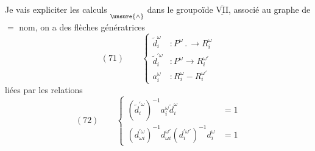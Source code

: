 Je vais expliciter les calculs $\underset{\unsure{\wedge}}{\vphantom{x}}$ dans le groupoïde $\overline{\underline{\mathrm{VII}}}$, associé au graphe de $=$ nom, on a des flèches génératrices
\[
(71)\qquad\left\{\begin{aligned}
\widetilde d_i^\omega&:P^\omega\mathpunct{.}\longrightarrow R_i^\omega\\
\widetilde d_i^{\prime\omega}&:P^\omega\longrightarrow R_i^{\omega'}\\
a_i^\omega&:R_i^\omega\mathbin{-}R_i^{\omega'}
\end{aligned}\right.
\]
liées par les relations
\[
(72)\qquad\left\{\begin{aligned}
(\widetilde d_i^{\prime\omega})^{-1}a_i^\omega\widetilde d_i^\omega&=1\\
(d_{\omega i}^{\prime\omega})^{-1}d_{\omega i}^{\omega'}(d_i^{\prime\omega'})^{-1}d_i^\omega&=1
\end{aligned}\right.
\]
